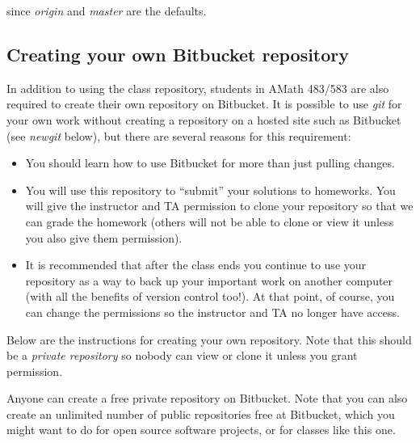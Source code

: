 \documentclass[letterpaper,10pt,english]{sphinxmanual}
\begin{document}
since \emph{origin} and \emph{master} are the defaults.


\subsection{Creating your own Bitbucket repository}
\label{git:mygit}\label{git:creating-your-own-bitbucket-repository}
In addition to using the class repository, students in AMath 483/583 are
also required to create their own repository on Bitbucket.  It is possible
to use \emph{git} for your own work without creating a repository on a hosted
site such as Bitbucket (see \emph{newgit} below), but there are several
reasons for this requirement:
\begin{itemize}
\item {} 
You should learn how to use Bitbucket for more than just pulling changes.

\item {} 
You will use this repository to ``submit'' your solutions to homeworks.
You will give the instructor and TA permission to clone your repository so
that we can grade the homework (others will not be able to clone or view it
unless you also give them permission).

\item {} 
It is recommended that after the class ends you
continue to use your repository as a way to back up your important work on
another computer (with all the benefits of version control too!).
At that point, of course, you can change the permissions so the
instructor and TA no longer have access.

\end{itemize}

Below are the instructions for creating your own repository.  Note that
this should be a \emph{private repository} so nobody can view or clone it unless
you grant permission.

Anyone can create a free private repository on Bitbucket.
Note that you can also create an unlimited number of public repositories
free at Bitbucket, which you might want to do for open source software
projects, or for classes like this one.
\end{document}
